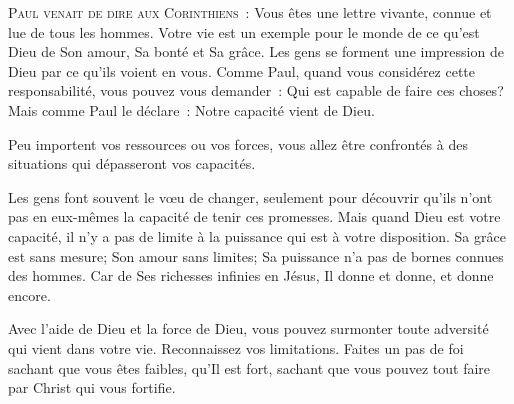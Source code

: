 



\lettrine{P}{aul venait de dire aux Corinthiens~:} 
 \og Vous êtes une lettre vivante, connue et lue de tous les hommes. \fg{}
 Votre vie est un exemple pour le monde de ce qu'est Dieu \ocadr de Son amour,
 Sa bonté et Sa grâce.
 Les gens se forment une impression de Dieu par ce qu'ils voient en vous.
 Comme Paul, quand vous considérez cette responsabilité, 
 vous pouvez vous demander~: 
 \og Qui est capable de faire ces choses? \fg{}
 Mais  comme Paul le déclare~: 
 \og Notre capacité vient de Dieu. \fg{}

Peu importent vos ressources ou vos forces,
 vous allez être confrontés à des situations qui dépasseront vos capacités.


Les gens font souvent le vœu de changer, seulement pour découvrir
 qu'ils n'ont pas en eux-mêmes la capacité de tenir ces promesses.
 Mais quand Dieu est votre capacité, il n'y a pas de limite à la puissance
 qui est à votre disposition.
 Sa grâce est sans mesure; Son amour sans limites;
 Sa puissance n'a pas de bornes connues des hommes.
 Car de Ses richesses infinies en Jésus, Il donne et donne, et donne encore.

Avec l'aide de Dieu et la force de Dieu, vous pouvez surmonter
 toute adversité qui vient dans votre vie. Reconnaissez vos limitations.
 Faites un pas de foi sachant que vous êtes faibles, qu'Il est fort,
 sachant que vous pouvez tout faire par Christ qui vous fortifie.

\dvrule




